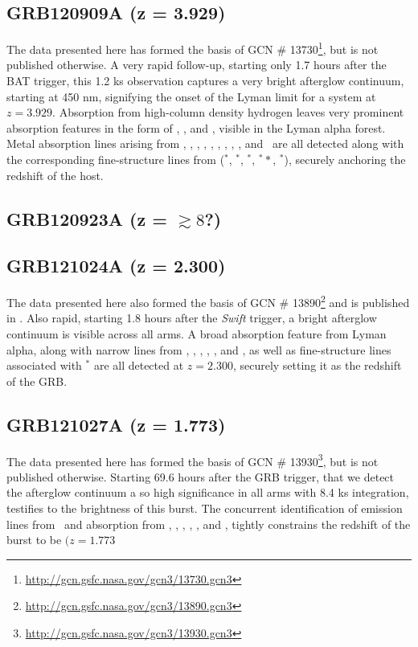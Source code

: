 \documentclass{aa}    %
\begin{document}
\subsection{GRB120909A (z = 3.929)}
The data presented here has formed the basis of GCN \#
13730\footnote{\url{http://gcn.gsfc.nasa.gov/gcn3/13730.gcn3}}, but is not
published otherwise. A very rapid follow-up, starting only 1.7 hours after the
BAT trigger, this 1.2 ks observation captures a very bright afterglow
continuum, starting at 450 nm, signifying the onset of the Lyman limit for a 
system at $z = 3.929$. Absorption from high-column density hydrogen leaves very
prominent absorption features in the form of \lya, \lyb, and \lyg, visible in
the Lyman alpha forest. Metal absorption lines arising from \feii, \NIii,
\SIii, \sii, \alii, \aliii, \cii, \oi, \civ, and \znii~are all detected along
with the corresponding fine-structure lines from (\feii$^*$, \SIii$^*$,
\oi$^*$, \oi$^**$, \cii$^*$), securely anchoring the redshift of the host.




\subsection{GRB120923A (z = $\gtrsim8$?)}






\subsection{GRB121024A (z = 2.300)}
The data presented here also formed the basis of GCN \#
13890\footnote{\url{http://gcn.gsfc.nasa.gov/gcn3/13890.gcn3}} and is published
in \citet{Friis2015}. Also rapid, starting 1.8 hours after the \textit{Swift}
trigger, a bright afterglow continuum is visible across all arms. A broad
absorption feature from Lyman alpha, along with narrow lines from \civ, \SIii,
\SIiv, \feii, \sii, and \alii, as well as fine-structure lines associated with
\SIii$^*$ are all detected at $z = 2.300$, securely setting it as the redshift
of the GRB.

\subsection{GRB121027A (z = 1.773)}		
The data presented here has formed the basis of GCN \#
13930\footnote{\url{http://gcn.gsfc.nasa.gov/gcn3/13930.gcn3}}, but is not
published otherwise. Starting 69.6 hours after the GRB trigger, that we detect
the afterglow continuum a so high significance in all arms with 8.4 ks
integration, testifies to the brightness of this burst. The concurrent
identification of emission lines from \oiii~and absorption from \civ, \alii,
\aliii, \mgi, \mgii, and \feii, tightly constrains the redshift of the burst to
be $(z = 1.773$
\end{document}

